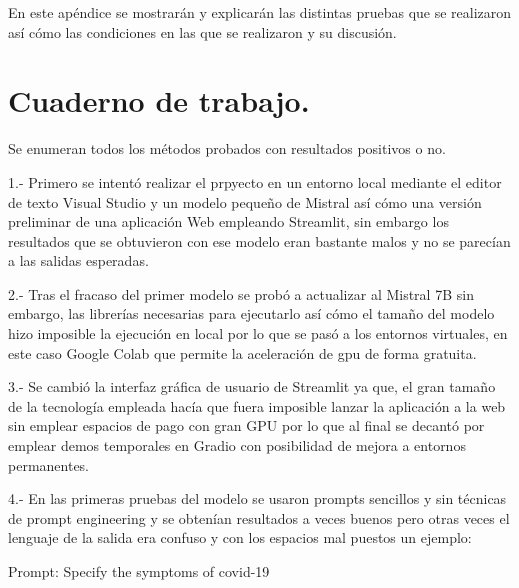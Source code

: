 
En este apéndice se mostrarán y explicarán las distintas pruebas que se realizaron así cómo las condiciones en las que se realizaron y su discusión.

\section{Cuaderno de trabajo.}

Se enumeran todos los métodos probados con resultados positivos o no.

1.- Primero se intentó realizar el prpyecto en un entorno local mediante el editor de texto Visual Studio y un modelo pequeño de Mistral así cómo una versión preliminar de una aplicación Web empleando Streamlit, sin embargo los resultados que se obtuvieron con ese modelo eran bastante malos y no se parecían a las salidas esperadas.

2.- Tras el fracaso del primer modelo se probó a actualizar al Mistral 7B sin embargo, las librerías necesarias para ejecutarlo así cómo el tamaño del modelo hizo imposible la ejecución en local por lo que se pasó a los entornos virtuales, en este caso Google Colab que permite la aceleración de gpu de forma gratuita.

3.- Se cambió la interfaz gráfica de usuario de Streamlit ya que, el gran tamaño de la tecnología empleada hacía que fuera imposible lanzar la aplicación a la web sin emplear espacios de pago con gran GPU por lo que al final se decantó por emplear demos temporales en Gradio con posibilidad de mejora a entornos permanentes.

4.- En las primeras pruebas del modelo se usaron prompts sencillos y sin técnicas de prompt engineering y se obtenían resultados a veces buenos pero otras veces el lenguaje de la salida era confuso y con los espacios mal puestos un ejemplo:

Prompt: Specify the symptoms of covid-19

